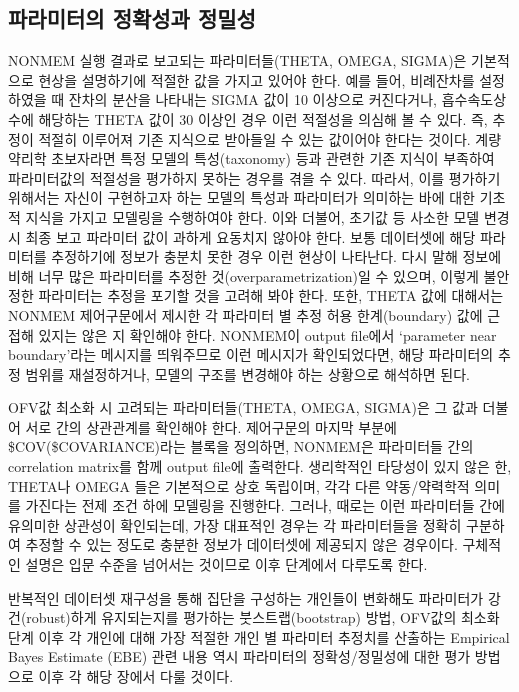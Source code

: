 \documentclass[
  10pt,
  krantz2,
  a4paper]{krantz}
\theoremstyle{definition}
\theoremstyle{definition}
\theoremstyle{definition}
\theoremstyle{remark}
\begin{document}
\hypertarget{uxd30cuxb77cuxbbf8uxd130uxc758-uxc815uxd655uxc131uxacfc-uxc815uxbc00uxc131}{%
\subsection{파라미터의 정확성과 정밀성}\label{uxd30cuxb77cuxbbf8uxd130uxc758-uxc815uxd655uxc131uxacfc-uxc815uxbc00uxc131}}

NONMEM 실행 결과로 보고되는 파라미터들(THETA, OMEGA, SIGMA)은 기본적으로 현상을 설명하기에 적절한 값을 가지고 있어야 한다. 예를 들어, 비례잔차를 설정하였을 때 잔차의 분산을 나타내는 SIGMA 값이 10 이상으로 커진다거나, 흡수속도상수에 해당하는 THETA 값이 30 이상인 경우 이런 적절성을 의심해 볼 수 있다. 즉, 추정이 적절히 이루어져 기존 지식으로 받아들일 수 있는 값이어야 한다는 것이다. 계량약리학 초보자라면 특정 모델의 특성(taxonomy) 등과 관련한 기존 지식이 부족하여 파라미터값의 적절성을 평가하지 못하는 경우를 겪을 수 있다. 따라서, 이를 평가하기 위해서는 자신이 구현하고자 하는 모델의 특성과 파라미터가 의미하는 바에 대한 기초적 지식을 가지고 모델링을 수행하여야 한다. 이와 더불어, 초기값 등 사소한 모델 변경 시 최종 보고 파라미터 값이 과하게 요동치지 않아야 한다. 보통 데이터셋에 해당 파라미터를 추정하기에 정보가 충분치 못한 경우 이런 현상이 나타난다. 다시 말해 정보에 비해 너무 많은 파라미터를 추정한 것(overparametrization)일 수 있으며, 이렇게 불안정한 파라미터는 추정을 포기할 것을 고려해 봐야 한다. 또한, THETA 값에 대해서는 NONMEM 제어구문에서 제시한 각 파라미터 별 추정 허용 한계(boundary) 값에 근접해 있지는 않은 지 확인해야 한다. NONMEM이 output file에서 `parameter near boundary'라는 메시지를 띄워주므로 이런 메시지가 확인되었다면, 해당 파라미터의 추정 범위를 재설정하거나, 모델의 구조를 변경해야 하는 상황으로 해석하면 된다.

OFV값 최소화 시 고려되는 파라미터들(THETA, OMEGA, SIGMA)은 그 값과 더불어 서로 간의 상관관계를 확인해야 한다. 제어구문의 마지막 부분에 \$COV(\$COVARIANCE)라는 블록을 정의하면, NONMEM은 파라미터들 간의 correlation matrix를 함께 output file에 출력한다. 생리학적인 타당성이 있지 않은 한, THETA나 OMEGA 들은 기본적으로 상호 독립이며, 각각 다른 약동/약력학적 의미를 가진다는 전제 조건 하에 모델링을 진행한다. 그러나, 때로는 이런 파라미터들 간에 유의미한 상관성이 확인되는데, 가장 대표적인 경우는 각 파라미터들을 정확히 구분하여 추정할 수 있는 정도로 충분한 정보가 데이터셋에 제공되지 않은 경우이다. 구체적인 설명은 입문 수준을 넘어서는 것이므로 이후 단계에서 다루도록 한다.

반복적인 데이터셋 재구성을 통해 집단을 구성하는 개인들이 변화해도 파라미터가 강건(robust)하게 유지되는지를 평가하는 붓스트랩(bootstrap) 방법, OFV값의 최소화 단계 이후 각 개인에 대해 가장 적절한 개인 별 파라미터 추정치를 산출하는 Empirical Bayes Estimate (EBE) 관련 내용 역시 파라미터의 정확성/정밀성에 대한 평가 방법으로 이후 각 해당 장에서 다룰 것이다.
\end{document}
